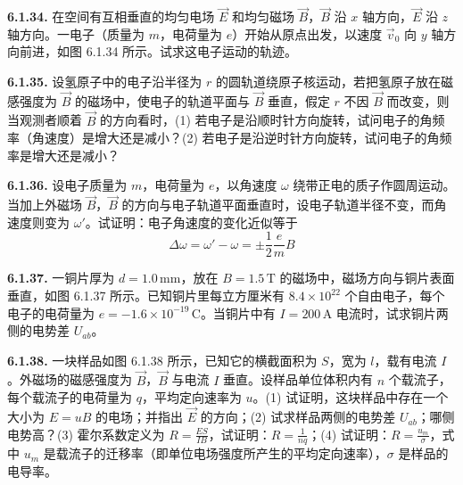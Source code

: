 \begin{center}
\end{center}

\vfill
\newpage

\textbf{6.1.34.} 在空间有互相垂直的均匀电场 $\vec{E}$ 和均匀磁场 $\vec{B}$，$\vec{B}$ 沿 $x$ 轴方向，$\vec{E}$ 沿 $z$ 轴方向。一电子（质量为 $m$，电荷量为 $e$）开始从原点出发，以速度 $\vec{v}_{0}$ 向 $y$ 轴方向前进，如图 6.1.34 所示。试求这电子运动的轨迹。

\begin{center}
\end{center}

\vfill
\newpage

\textbf{6.1.35.} 设氢原子中的电子沿半径为 $r$ 的圆轨道绕原子核运动，若把氢原子放在磁感强度为 $\vec{B}$ 的磁场中，使电子的轨道平面与 $\vec{B}$ 垂直，假定 $r$ 不因 $\vec{B}$ 而改变，则当观测者顺着 $\vec{B}$ 的方向看时，(1) 若电子是沿顺时针方向旋转，试问电子的角频率（角速度）是增大还是减小？(2) 若电子是沿逆时针方向旋转，试问电子的角频率是增大还是减小？

\vfill
\newpage

\textbf{6.1.36.} 设电子质量为 $m$，电荷量为 $e$，以角速度 $\omega$ 绕带正电的质子作圆周运动。当加上外磁场 $\vec{B}$，$\vec{B}$ 的方向与电子轨道平面垂直时，设电子轨道半径不变，而角速度则变为 $\omega'$。试证明：电子角速度的变化近似等于
\[
\Delta \omega = \omega' - \omega = \pm \frac{1}{2} \frac{e}{m} B
\]

\vfill
\newpage

\textbf{6.1.37.} 一铜片厚为 $d = 1.0\,\mathrm{mm}$，放在 $B = 1.5\,\mathrm{T}$ 的磁场中，磁场方向与铜片表面垂直，如图 6.1.37 所示。已知铜片里每立方厘米有 $8.4 \times 10^{22}$ 个自由电子，每个电子的电荷量为 $e = -1.6 \times 10^{-19}\,\mathrm{C}$。当铜片中有 $I = 200\,\mathrm{A}$ 电流时，试求铜片两侧的电势差 $U_{ab}$。

\begin{center}
\end{center}

\vfill
\newpage

\textbf{6.1.38.} 一块样品如图 6.1.38 所示，已知它的横截面积为 $S$，宽为 $l$，载有电流 $I$。外磁场的磁感强度为 $\vec{B}$，$\vec{B}$ 与电流 $I$ 垂直。设样品单位体积内有 $n$ 个载流子，每个载流子的电荷量为 $q$，平均定向速率为 $u$。(1) 试证明，这块样品中存在一个大小为 $E = uB$ 的电场；并指出 $\vec{E}$ 的方向；(2) 试求样品两侧的电势差 $U_{ab}$；哪侧电势高？(3) 霍尔系数定义为 $\displaystyle R = \frac{ES}{IB}$，试证明：$\displaystyle R = \frac{1}{nq}$；(4) 试证明：$\displaystyle R = \frac{u_{m}}{\sigma}$，式中 $u_{m}$ 是载流子的迁移率（即单位电场强度所产生的平均定向速率），$\sigma$ 是样品的电导率。

